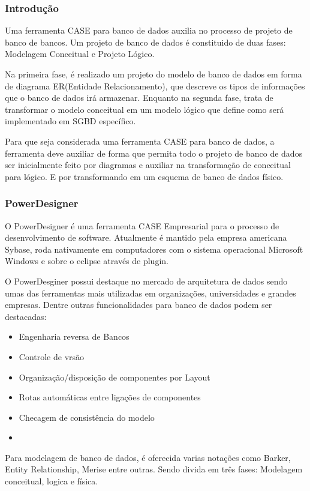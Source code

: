 \documentclass[12pt,a4paper]{article}
\begin{document}
		\subsubsection{Introdução}
			Uma ferramenta CASE para banco de dados auxilia no processo de projeto de banco de bancos. Um projeto de banco de
			dados é constituido de duas fases: Modelagem Conceitual e Projeto Lógico. 
			
			Na primeira fase, é realizado um projeto do modelo de banco de dados em forma de diagrama ER(Entidade
			Relacionamento), que descreve os tipos de informações que o banco de dados irá armazenar. Enquanto na segunda fase,
			trata de transformar o modelo conceitual em um modelo lógico que define como será implementado em SGBD específico.
			
			Para que seja considerada uma ferramenta CASE para banco de dados, a ferramenta deve auxiliar de forma que permita
			todo o projeto de banco de dados ser inicialmente feito por diagramas e auxiliar na transformação de conceitual para
			lógico. E por transformando em um esquema de banco de dados físico.
			
		\subsubsection{PowerDesigner}
			O PowerDesigner é uma ferramenta CASE Empresarial para o processo de desenvolvimento de software. Atualmente é
			mantido pela empresa americana Sybase, roda nativamente em computadores com o sistema operacional Microsoft Windows
			e sobre o eclipse através de plugin.
			
			O PowerDesginer possui destaque no mercado de arquitetura de dados sendo umas das ferramentas mais utilizadas em
			organizações, universidades e grandes empresas. Dentre outras funcionalidades para banco de dados podem ser
			destacadas:
			\begin{itemize}
			  \item Engenharia reversa de Bancos
			  \item Controle de vrsão
			  \item Organização/disposição de componentes por Layout
			  \item Rotas automáticas entre ligações de componentes
			  \item Checagem de consistência do modelo
			  \item
			\end{itemize}
			
			Para modelagem de banco de dados, é oferecida varias notações como Barker, Entity Relationship, Merise entre outras.
			Sendo divida em três fases: Modelagem conceitual, logica e física.
\end{document}
